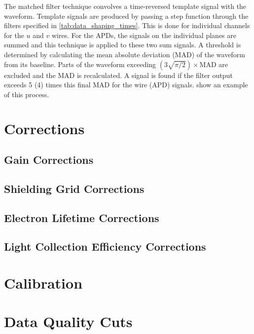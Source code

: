 \documentclass[herrin-thesis.tex]{subfiles}
\begin{document}
The matched filter technique\cite{North:1963fk} convolves a time-reversed template signal with the waveform. Template signals are produced by passing a step function through the filters specified in \cref{tab:data_shaping_times}. This is done for individual channels for the \(u\) and \(v\) wires. For the APDs, the signals on the individual planes are summed and this technique is applied to these two sum signals. A threshold is determined by calculating the mean absolute deviation (MAD) of the waveform from its baseline. Parts of the waveform exceeding \((3\sqrt{\pi/2})\times\text{MAD}\) are excluded and the MAD is recalculated. A signal is found if the filter output exceeds 5 (4) times this final MAD for the wire (APD) signals.  show an example of this process.


\section{Corrections}
\subsection{Gain Corrections}
\subsection{Shielding Grid Corrections}
\subsection{Electron Lifetime Corrections}
\subsection{Light Collection Efficiency Corrections}

\section{Calibration}

\section{Data Quality Cuts}
\end{document}
